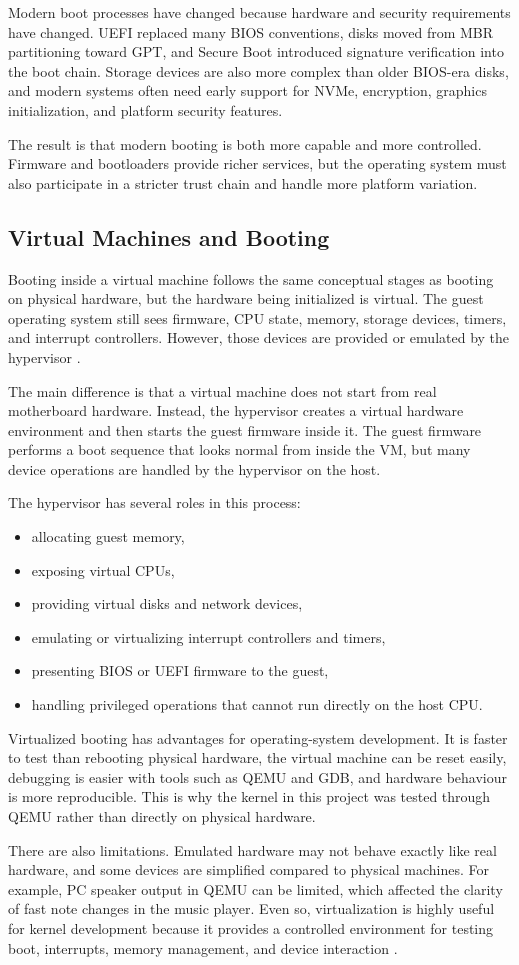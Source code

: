 Modern boot processes have changed because hardware and security requirements have changed. UEFI replaced many BIOS conventions, disks moved from MBR partitioning toward GPT, and Secure Boot introduced signature verification into the boot chain. Storage devices are also more complex than older BIOS-era disks, and modern systems often need early support for NVMe, encryption, graphics initialization, and platform security features.

The result is that modern booting is both more capable and more controlled. Firmware and bootloaders provide richer services, but the operating system must also participate in a stricter trust chain and handle more platform variation.

\subsection{Virtual Machines and Booting}
Booting inside a virtual machine follows the same conceptual stages as booting on physical hardware, but the hardware being initialized is virtual. The guest operating system still sees firmware, CPU state, memory, storage devices, timers, and interrupt controllers. However, those devices are provided or emulated by the hypervisor \cite{qemuPcMachine}.

The main difference is that a virtual machine does not start from real motherboard hardware. Instead, the hypervisor creates a virtual hardware environment and then starts the guest firmware inside it. The guest firmware performs a boot sequence that looks normal from inside the VM, but many device operations are handled by the hypervisor on the host.

The hypervisor has several roles in this process:
\begin{itemize}
  \item allocating guest memory,
  \item exposing virtual CPUs,
  \item providing virtual disks and network devices,
  \item emulating or virtualizing interrupt controllers and timers,
  \item presenting BIOS or UEFI firmware to the guest,
  \item handling privileged operations that cannot run directly on the host CPU.
\end{itemize}

Virtualized booting has advantages for operating-system development. It is faster to test than rebooting physical hardware, the virtual machine can be reset easily, debugging is easier with tools such as QEMU and GDB, and hardware behaviour is more reproducible. This is why the kernel in this project was tested through QEMU rather than directly on physical hardware.

There are also limitations. Emulated hardware may not behave exactly like real hardware, and some devices are simplified compared to physical machines. For example, PC speaker output in QEMU can be limited, which affected the clarity of fast note changes in the music player. Even so, virtualization is highly useful for kernel development because it provides a controlled environment for testing boot, interrupts, memory management, and device interaction \cite{qemuPcMachine}.
